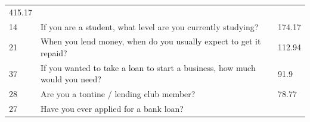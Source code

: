 \begin{longtable}[]{@{}lll@{}}
\begin{minipage}[t]{0.09\columnwidth}
415.17\strut
\end{minipage}\tabularnewline
\begin{minipage}[t]{0.05\columnwidth}\raggedright
14\strut
\end{minipage} & \begin{minipage}[t]{0.77\columnwidth}\raggedright
If you are a student, what level are you currently studying?\strut
\end{minipage} & \begin{minipage}[t]{0.09\columnwidth}\raggedright
174.17\strut
\end{minipage}\tabularnewline
\begin{minipage}[t]{0.05\columnwidth}\raggedright
21\strut
\end{minipage} & \begin{minipage}[t]{0.77\columnwidth}\raggedright
When you lend money, when do you usually expect to get it repaid?\strut
\end{minipage} & \begin{minipage}[t]{0.09\columnwidth}\raggedright
112.94\strut
\end{minipage}\tabularnewline
\begin{minipage}[t]{0.05\columnwidth}\raggedright
37\strut
\end{minipage} & \begin{minipage}[t]{0.77\columnwidth}\raggedright
If you wanted to take a loan to start a business, how much would you
need?\strut
\end{minipage} & \begin{minipage}[t]{0.09\columnwidth}\raggedright
91.9\strut
\end{minipage}\tabularnewline
\begin{minipage}[t]{0.05\columnwidth}\raggedright
28\strut
\end{minipage} & \begin{minipage}[t]{0.77\columnwidth}\raggedright
Are you a tontine / lending club member?\strut
\end{minipage} & \begin{minipage}[t]{0.09\columnwidth}\raggedright
78.77\strut
\end{minipage}\tabularnewline
\begin{minipage}[t]{0.05\columnwidth}\raggedright
27\strut
\end{minipage} & \begin{minipage}[t]{0.77\columnwidth}\raggedright
Have you ever applied for a bank loan?\strut
\end{minipage} & \begin{minipage}[t]{0.09\columnwidth}\raggedright

\end{minipage}
\end{longtable}
